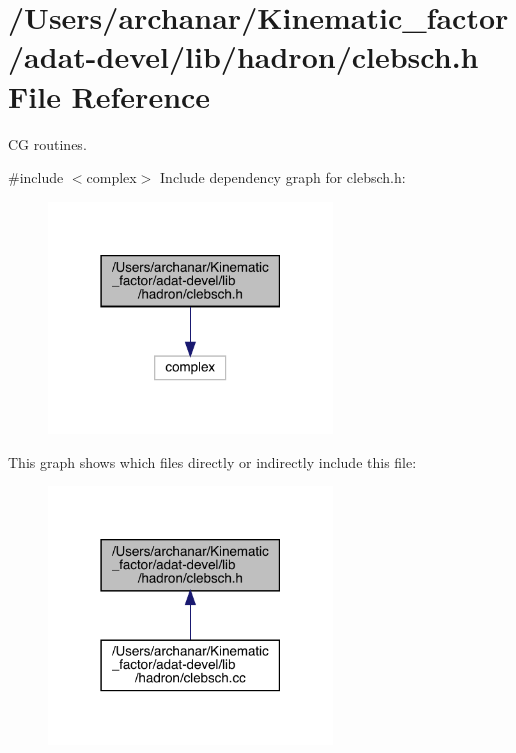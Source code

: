 \hypertarget{adat-devel_2lib_2hadron_2clebsch_8h}{}\section{/\+Users/archanar/\+Kinematic\+\_\+factor/adat-\/devel/lib/hadron/clebsch.h File Reference}
\label{adat-devel_2lib_2hadron_2clebsch_8h}


CG routines.  


{\ttfamily \#include $<$complex$>$}\newline
Include dependency graph for clebsch.\+h\+:
\nopagebreak
\begin{figure}[H]
\begin{center}
\leavevmode
\includegraphics[width=214pt]{db/dd8/adat-devel_2lib_2hadron_2clebsch_8h__incl}
\end{center}
\end{figure}
This graph shows which files directly or indirectly include this file\+:
\nopagebreak
\begin{figure}[H]
\begin{center}
\leavevmode
\includegraphics[width=214pt]{d7/dd4/adat-devel_2lib_2hadron_2clebsch_8h__dep__incl}
\end{center}
\end{figure}
